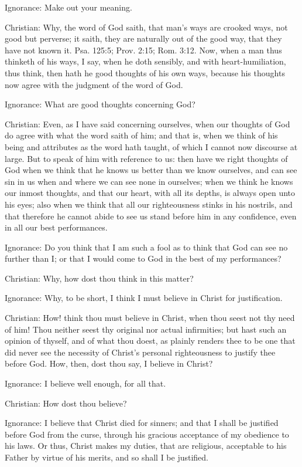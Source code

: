 Ignorance: Make out your meaning.

Christian: Why, the word of God saith, that man's ways are crooked
ways, not good but perverse; it saith, they are naturally out of the
good way, that they have not known it. Psa. 125:5; Prov. 2:15; Rom.
3:12. Now, when a man thus thinketh of his ways, I say, when he doth
sensibly, and with heart-humiliation, thus think, then hath he good
thoughts of his own ways, because his thoughts now agree with the
judgment of the word of God.

Ignorance: What are good thoughts concerning God?

Christian: Even, as I have said concerning ourselves, when our thoughts
of God do agree with what the word saith of him; and that is, when we
think of his being and attributes as the word hath taught, of which I
cannot now discourse at large. But to speak of him with reference to
us: then have we right thoughts of God when we think that he knows us
better than we know ourselves, and can see sin in us when and where we
can see none in ourselves; when we think he knows our inmost thoughts,
and that our heart, with all its depths, is always open unto his eyes;
also when we think that all our righteousness stinks in his nostrils,
and that therefore he cannot abide to see us stand before him in any
confidence, even in all our best performances.

Ignorance: Do you think that I am such a fool as to think that God can
see no further than I; or that I would come to God in the best of my
performances?

Christian: Why, how dost thou think in this matter?

Ignorance: Why, to be short, I think I must believe in Christ for
justification.

Christian: How! think thou must believe in Christ, when thou seest not
thy need of him! Thou neither seest thy original nor actual
infirmities; but hast such an opinion of thyself, and of what thou
doest, as plainly renders thee to be one that did never see the
necessity of Christ's personal righteousness to justify thee before
God. How, then, dost thou say, I believe in Christ?

Ignorance: I believe well enough, for all that.

Christian: How dost thou believe?

Ignorance: I believe that Christ died for sinners; and that I shall be
justified before God from the curse, through his gracious acceptance of
my obedience to his laws. Or thus, Christ makes my duties, that are
religious, acceptable to his Father by virtue of his merits, and so
shall I be justified.

